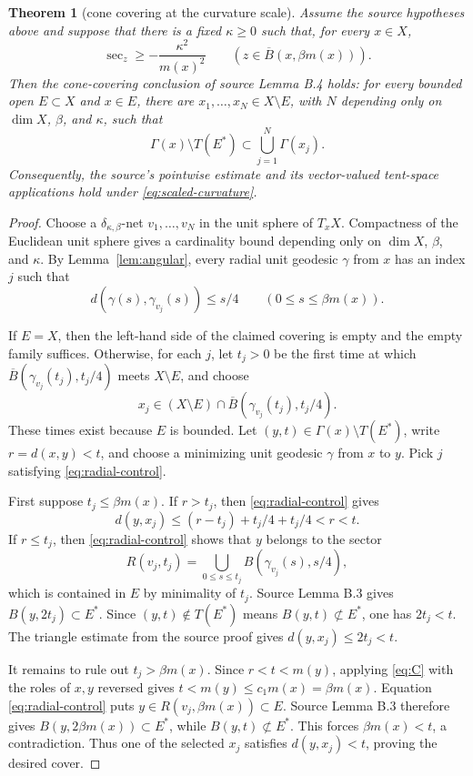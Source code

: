\documentclass[11pt]{article}
\newtheorem{theorem}{Theorem}
\newcommand{\Gammaa}{\Gamma}
\begin{document}
\begin{theorem}[cone covering at the curvature scale]\label{thm:main}
Assume the source hypotheses above and suppose that there is a fixed
$\kappa\geq0$ such that, for every $x\in X$,
\begin{equation}\label{eq:scaled-curvature}
 \sec_z\geq-\frac{\kappa^2}{m(x)^2}
 \qquad(z\in \overline B(x,\beta m(x))).
\end{equation}
Then the cone-covering conclusion of source Lemma B.4 holds: for every
bounded open $E\subset X$ and $x\in E$, there are
$x_1,\ldots,x_N\in X\setminus E$, with $N$ depending only on
$\dim X$, $\beta$, and $\kappa$, such that
\[
 \Gammaa(x)\setminus T(E^*)
 \subset\bigcup_{j=1}^N\Gammaa(x_j).
\]
Consequently, the source's pointwise estimate and its vector-valued
tent-space applications hold under \eqref{eq:scaled-curvature}.
\end{theorem}

\begin{proof}
Choose a $\delta_{\kappa,\beta}$-net
$v_1,\ldots,v_N$ in the unit sphere of $T_xX$.  Compactness of the
Euclidean unit sphere gives a cardinality bound depending only on
$\dim X$, $\beta$, and $\kappa$.  By Lemma~\ref{lem:angular}, every radial
unit geodesic $\gamma$ from $x$ has an index $j$ such that
\begin{equation}\label{eq:radial-control}
 d(\gamma(s),\gamma_{v_j}(s))\leq s/4
 \qquad(0\leq s\leq\beta m(x)).
\end{equation}

If $E=X$, then the left-hand side of the claimed covering is empty and the
empty family suffices.  Otherwise, for each $j$, let $t_j>0$ be the first
time at which
$\overline B(\gamma_{v_j}(t_j),t_j/4)$ meets $X\setminus E$, and choose
\[
 x_j\in(X\setminus E)\cap
 \overline B(\gamma_{v_j}(t_j),t_j/4).
\]
These times exist because $E$ is bounded.  Let
$(y,t)\in\Gammaa(x)\setminus T(E^*)$, write $r=d(x,y)<t$, and choose a
minimizing unit geodesic $\gamma$ from $x$ to $y$.  Pick $j$ satisfying
\eqref{eq:radial-control}.

First suppose $t_j\leq\beta m(x)$.  If $r>t_j$, then
\eqref{eq:radial-control} gives
\[
 d(y,x_j)\leq(r-t_j)+t_j/4+t_j/4<r<t.
\]
If $r\leq t_j$, then \eqref{eq:radial-control} shows that $y$ belongs to
the sector
\[
 R(v_j,t_j)=\bigcup_{0\leq s\leq t_j}
 B(\gamma_{v_j}(s),s/4),
\]
which is contained in $E$ by minimality of $t_j$.  Source Lemma B.3 gives
$B(y,2t_j)\subset E^*$.  Since
$(y,t)\notin T(E^*)$ means $B(y,t)\not\subset E^*$, one has $2t_j<t$.
The triangle estimate from the source proof gives $d(y,x_j)\leq2t_j<t$.

It remains to rule out $t_j>\beta m(x)$.  Since $r<t<m(y)$, applying
\eqref{eq:C} with the roles of $x,y$ reversed gives
$t<m(y)\leq c_1m(x)=\beta m(x)$.  Equation
\eqref{eq:radial-control} puts
$y\in R(v_j,\beta m(x))\subset E$.  Source Lemma B.3 therefore gives
$B(y,2\beta m(x))\subset E^*$, while
$B(y,t)\not\subset E^*$.  This forces $\beta m(x)<t$, a contradiction.
Thus one of the selected $x_j$ satisfies $d(y,x_j)<t$, proving the desired
cover.
\end{proof}
\end{document}
